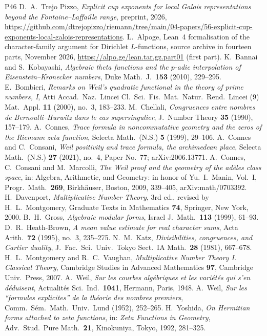 \documentclass[10pt]{amsart}
\theoremstyle{definition}
\theoremstyle{remark}
\begin{document}
\begin{thebibliography}{P46}
 D.~A.~Trejo Pizzo, \emph{Explicit cup exponents for local Galois representations beyond the Fontaine--Laffaille range}, preprint, 2026, \url{https://github.com/dtrejopizzo/riemann/tree/main/04-papers/56-explicit-cup-exponents-local-galois-representations}.
 L.~Alpoge, Lean~4 formalisation of the character-family argument
for Dirichlet $L$-functions, source archive in fourteen parts, November 2026,
\url{https://alpo.ge/lean.tar.gz.part01} (first part).
 K.~Bannai and S.~Kobayashi, \emph{Algebraic theta functions and the
$p$-adic interpolation of Eisenstein--Kronecker numbers}, Duke Math.\ J.\ \textbf{153} (2010),
229--295.
 E.~Bombieri, \emph{Remarks on Weil's quadratic functional in the theory of
prime numbers, I}, Atti Accad.~Naz.~Lincei Cl.~Sci.~Fis.~Mat.~Natur.~Rend.~Lincei (9) Mat.~Appl.
\textbf{11} (2000), no.~3, 183--233.
 M.~Chellali, \emph{Congruences entre nombres de Bernoulli--Hurwitz dans le cas
supersingulier}, J.\ Number Theory \textbf{35} (1990), 157--179.
 A.~Connes, \emph{Trace formula in noncommutative geometry and the zeros of
the Riemann zeta function}, Selecta Math.\ (N.S.) \textbf{5} (1999), 29--106.
 A.~Connes and C.~Consani, \emph{Weil positivity and trace formula, the archimedean place}, Selecta Math.\ (N.S.) \textbf{27} (2021), no.~4, Paper No.~77; arXiv:2006.13771.
 A.~Connes, C.~Consani and M.~Marcolli, \emph{The Weil proof and the geometry
of the ad\`eles class space}, in: Algebra, Arithmetic, and Geometry: in honor
of Yu.~I.~Manin, Vol.~I, Progr.\ Math.\ \textbf{269}, Birkh\"auser, Boston,
2009, 339--405, arXiv:math/0703392.
 H.~Davenport, \emph{Multiplicative Number Theory}, 3rd ed., revised by
H.~L.~Montgomery, Graduate Texts in Mathematics \textbf{74}, Springer, New York, 2000.
 B.~H.~Gross, \emph{Algebraic modular forms}, Israel J.\ Math.\ \textbf{113}
(1999), 61--93.
 D.~R.~Heath-Brown, \emph{A mean value estimate for real character
sums}, Acta Arith.\ \textbf{72} (1995), no.~3, 235--275.
 N.~M.~Katz, \emph{Divisibilities, congruences, and Cartier duality},
J.\ Fac.\ Sci.\ Univ.\ Tokyo Sect.\ IA Math.\ \textbf{28} (1981), 667--678.
 H.~L.~Montgomery and R.~C.~Vaughan, \emph{Multiplicative Number Theory I.
Classical Theory}, Cambridge Studies in Advanced Mathematics \textbf{97}, Cambridge
Univ.~Press, 2007.
 A.~Weil, \emph{Sur les courbes alg\'ebriques et les vari\'et\'es qui s'en
d\'eduisent}, Actualit\'es Sci.\ Ind.\ \textbf{1041}, Hermann, Paris, 1948.
 A.~Weil, \emph{Sur les ``formules explicites'' de la th\'eorie des nombres
premiers}, Comm.~S\'em.~Math.~Univ.~Lund (1952), 252--265.
 H.~Yoshida, \emph{On Hermitian forms attached to zeta functions}, in:
\emph{Zeta Functions in Geometry}, Adv.~Stud.~Pure Math.~\textbf{21}, Kinokuniya, Tokyo, 1992, 281--325.
\end{thebibliography}
\end{document}
